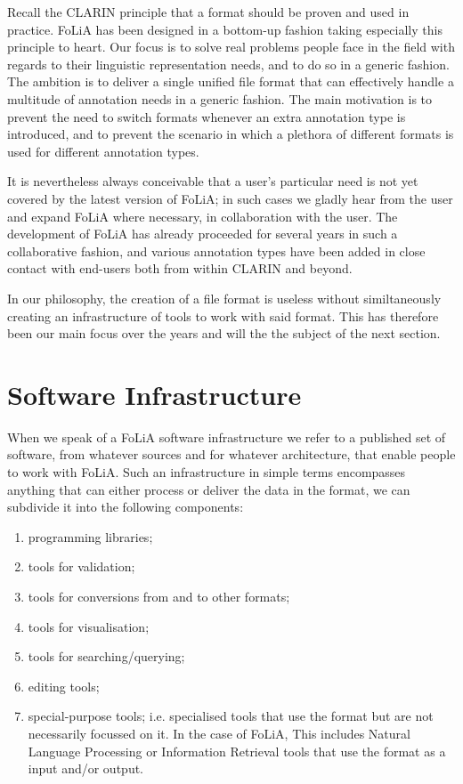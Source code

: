 \documentclass[a4paper,11pt]{article}
\begin{document}
Recall the CLARIN principle that a format should be proven and used in
practice. FoLiA has been designed in a bottom-up fashion taking especially this
principle to heart. Our focus is to solve real problems people face in the
field with regards to their linguistic representation needs, and to do so in a
generic fashion. The ambition is to deliver a single unified file format that
can effectively handle a multitude of annotation needs in a generic fashion.
The main motivation is to prevent the need to switch formats whenever an extra
annotation type is introduced, and to prevent the scenario in which a plethora
of different formats is used for different annotation types.

It is nevertheless always conceivable that a user's particular need is not yet
covered by the latest version of FoLiA; in such cases we gladly hear from the
user and expand FoLiA where necessary, in collaboration with the user. The
development of FoLiA has already proceeded for several years in such a
collaborative fashion, and various annotation types have been added in close
contact with end-users both from within CLARIN and beyond.

In our philosophy, the creation of a file format is useless without
similtaneously creating an infrastructure of tools to work with said format.
This has therefore been our main focus over the years and will the the subject
of the next section.

\section{Software Infrastructure}
\label{sec:softwareinfrastructure}

When we speak of a FoLiA software infrastructure we refer to a published set of
software, from whatever sources and for whatever architecture, that enable
people to work with FoLiA. Such an infrastructure in simple terms encompasses
anything that can either process or deliver the data in the format, we can
subdivide it into the following components:

\begin{enumerate}
\item programming libraries;
\item tools for validation;
\item tools for conversions from and to other formats;
\item tools for visualisation;
\item tools for searching/querying;
\item editing tools;
\item special-purpose tools; i.e. specialised tools that use the format but are
    not necessarily focussed on it. In the case of FoLiA, This includes Natural
    Language Processing or Information Retrieval tools that use the format as a
    input and/or output.
\end{enumerate}
\end{document}

